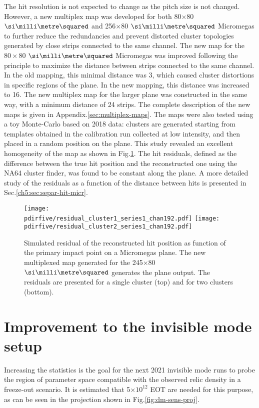 The hit resolution is not expected to change as the pitch size is not changed. However, a new multiplex map was developed for both 80$\times$80 $\mms$ and 256$\times$80 $\mms$ Micromegas to further reduce the redundancies and prevent distorted cluster topologies generated by close strips connected to the same channel. The new map for the $80\times80$ $\mms$ Micromegas was improved following the principle to maximize the distance between strips connected to the same channel. In the old mapping, this minimal distance was 3, which caused cluster distortions in specific regions of the plane. In the new mapping, this distance was increased to 16. The new multiplex map for the larger plane was constructed in the same way, with a minimum distance of 24 strips. The complete description of the new maps is given in Appendix.\ref{sec:multiplex-maps}. The maps were also tested using a toy Monte-Carlo based on 2018 data: clusters are generated starting from templates obtained in the calibration run collected at low intensity, and then placed in a random position on the plane. This study revealed an excellent homogeneity of the map as shown in Fig.\ref{fig:mm-mult-study}. The hit residuals, defined as the difference between the true hit position and the reconstructed one using the NA64 cluster finder, was found to be constant along the plane. A more detailed study of the residuals as a function of the distance between hits is presented in Sec.\ref{ch5:sec:separ-hit-micr}.

\begin{figure}
    \centering
    \texttt{[image: \\pdirfive/residual\_cluster1\_series1\_chan192.pdf]}
    \texttt{[image: \\pdirfive/residual\_cluster2\_series1\_chan192.pdf]}
    \caption[Test of new multiplex map]{Simulated residual of the reconstructed hit position as function of the primary impact point on a Micromegas plane. The new multiplexed map generated for the 245$\times$80 $\mms$ generates the plane output. The residuals are presented for a single cluster (top) and for two clusters (bottom).}
    \label{fig:mm-mult-study}
\end{figure}


\FloatBarrier\noindent
\section{Improvement to the invisible mode setup}
\label{ch5:sec:new-invismode-setup}

Increasing the statistics is the goal for the next 2021 invisible mode runs to probe the region of parameter space compatible with the observed relic density in a freeze-out scenario. It is estimated that 5$\times 10^{12}$ EOT are needed for this purpose, as can be seen in the projection shown in Fig.\ref{fig:dm-sens-proj}.

